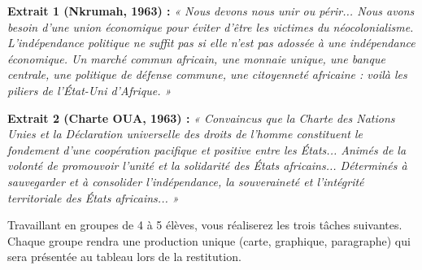 \documentclass[11pt]{article}
\newcounter{popsec}
\newcounter{popsub}
\newcommand{\courssub}[1]{%
  \stepcounter{popsub}%
  \par\vspace{9pt}\noindent{\popxbold\fontsize{11.5}{13}\selectfont\color{popink}{\color{poporange}\thepopsec.\thepopsub}\hspace{6pt}#1}\par\nopagebreak\vspace{4pt}
}
\begin{document}
\textbf{Extrait 1 (Nkrumah, 1963) :} \emph{« Nous devons nous unir ou périr... Nous avons besoin d'une union économique pour éviter d'être les victimes du néocolonialisme. L'indépendance politique ne suffit pas si elle n'est pas adossée à une indépendance économique. Un marché commun africain, une monnaie unique, une banque centrale, une politique de défense commune, une citoyenneté africaine : voilà les piliers de l'État-Uni d'Afrique. »}

\textbf{Extrait 2 (Charte OUA, 1963) :} \emph{« Convaincus que la Charte des Nations Unies et la Déclaration universelle des droits de l'homme constituent le fondement d'une coopération pacifique et positive entre les États... Animés de la volonté de promouvoir l'unité et la solidarité des États africains... Déterminés à sauvegarder et à consolider l'indépendance, la souveraineté et l'intégrité territoriale des États africains... »}

\courssub{Consignes}
Travaillant en groupes de 4 à 5 élèves, vous réaliserez les trois tâches suivantes. Chaque groupe rendra une production unique (carte, graphique, paragraphe) qui sera présentée au tableau lors de la restitution.
\end{document}
